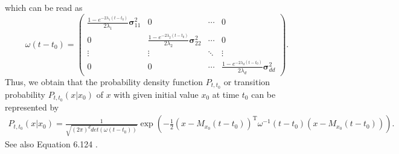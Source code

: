 \documentclass[11pt,titlepage]{article}
\theoremstyle{definition}
\theoremstyle{remark}
\begin{document}
	which can be read as 
	\[\omega(t-t_0) = \begin{pmatrix}
		\frac{1- e^{-2\lambda_1 (t-t_0)}}{2\lambda_1} \boldsymbol{\sigma}_{11}^2  & 0 &\cdots & 0 \\
		0 & \frac{1- e^{-2\lambda_2 (t-t_0)}}{2\lambda_2} \boldsymbol{\sigma}_{22}^2  & \cdots & 0 \\
		\vdots & \vdots & \ddots & \vdots \\
		0 & 0 & \cdots & \frac{1- e^{-2\lambda_d (t-t_0)}}{2\lambda_d} \boldsymbol{\sigma}_{dd}^2 
	\end{pmatrix}.\]
	Thus, we obtain that the probability density function $P_{t,t_0}$ or transition probability $P_{t,t_0}(x\vert x_0)$ of $x$ with 
	given initial value $x_0$ at time $t_0$ can be represented by
	\begin{align}
		P_{t,t_0}(x\vert x_0) = \frac{1}{\sqrt{(2\pi)^d det(\omega(t-t_0))}}\exp\left(-\frac{1}{2}(x- M_{x_0}(t-t_0))^{\text{T}}\omega^{-1}(t-t_0)(x-M_{x_0}(t-t_0))\right).\label{prop dens func}
	\end{align}
	See also Equation 6.124 \cite{Risken1996}.
	
\end{document}
